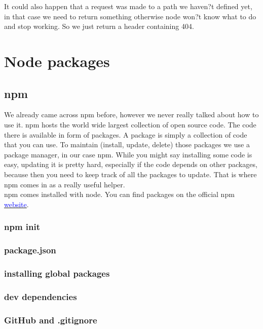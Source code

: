 \documentclass[a4paper]{article}
\begin{document}
It could also happen that a request was made to a path we haven?t defined yet, in that case we need to return something otherwise node won?t know what to do and stop working. So we just return a header containing 404.






\section{Node packages}
\subsection{npm}
We already came across npm before, however we never really talked about how to use it. npm hosts the world wide largest collection of open source code. The code there is available in form of packages. A package is simply a collection of code that you can use. To maintain (install, update, delete) those packages we use a package manager, in our case npm. While you might say installing some code is easy, updating it is pretty hard, especially if the code depends on other packages, because then you need to keep track of all the packages to update. That is where npm comes in as a really useful helper.
\\
npm comes installed with node. You can find packages on the official npm \href{https://www.npmjs.com}{\textcolor{blue}{website}}.

\subsubsection{npm init}

\subsubsection{package.json}

\subsubsection{installing global packages}

\subsubsection{dev dependencies}

\subsubsection{GitHub and .gitignore}
\end{document}
